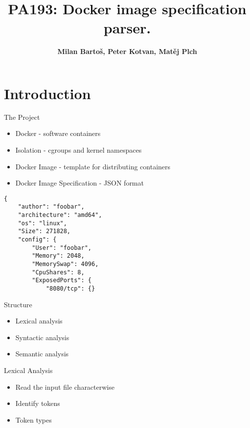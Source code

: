 \documentclass{beamer}
\title[Docker Img Spec Parser]{PA193: Docker image specification parser.} %
\author{\textbf{Milan Bartoš, Peter Kotvan, Matěj Plch}}
\institute[FI MUNI] %
{
FI MUNI \\ %
\medskip
}
\begin{document}
\begin{frame}
\titlepage %
\end{frame}


\section{Introduction}

\begin{frame}[fragile]{The Project}

\begin{itemize}
    \item Docker - software containers
    \pause \item Isolation - cgroups and kernel namespaces
    \pause \item Docker Image - template for distributing containers
    \pause \item Docker Image Specification - JSON format
\end{itemize}

\pause \begin{verbatim}
{
    "author": "foobar",
    "architecture": "amd64",
    "os": "linux",
    "Size": 271828,
    "config": {
        "User": "foobar",
        "Memory": 2048,
        "MemorySwap": 4096,
        "CpuShares": 8,
        "ExposedPorts": {  
            "8080/tcp": {}
\end{verbatim}
\end{frame}

\begin{frame}{Structure}

\begin{itemize}
    \item Lexical analysis
    \item Syntactic analysis
    \item Semantic analysis
\end{itemize}
\end{frame}

\begin{frame}{Lexical Analysis}

\begin{itemize}
    \item Read the input file characterwise
    \item Identify tokens
    \item Token types
\end{itemize}

\end{frame}
\end{document}
